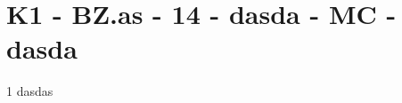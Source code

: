 \section{K1 - BZ.as - 14 - dasda - MC - dasda}

\begin{langesbeispiel} \item[1] %
dasdas
\end{langesbeispiel}